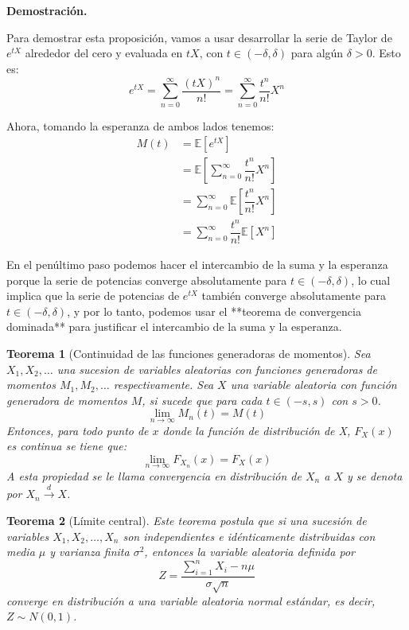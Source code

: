 \documentclass[
 12pt,
 letterpaper,
]{article}
\theoremstyle{teoremaBreak}
\newtheorem{teorema}{Teorema}[section]
\theoremstyle{plain}
\theoremstyle{definition}
\begin{document}
\textbf{Demostración.}

Para demostrar esta proposición, vamos a usar desarrollar la serie de Taylor de $e^{tX}$ alrededor 
del cero y evaluada en $tX$, con $t \in (-\delta, \delta)$ para algún $\delta > 0$. Esto es:
$$e^{tX} = \sum_{n=0}^{\infty} \dfrac{(tX)^n}{n!} = \sum_{n=0}^{\infty} \dfrac{t^n}{n!} X^n$$

Ahora, tomando la esperanza de ambos lados tenemos:
\begin{align*}
M(t) &= \mathbb{E}[e^{tX}] \\
&= \mathbb{E}\left[\sum_{n=0}^{\infty} \dfrac{t^n}{n!} X^n\right] \\
&= \sum_{n=0}^{\infty} \mathbb{E}\left[ \dfrac{t^n}{n!} X^n\right] \\
&= \sum_{n=0}^{\infty} \dfrac{t^n}{n!} \mathbb{E}[X^n]
\end{align*}

En el penúltimo paso podemos hacer el intercambio de la suma y la esperanza porque 
la serie de potencias converge absolutamente para $t \in (-\delta, \delta)$, 
lo cual implica que la serie de potencias de $e^{tX}$ también converge absolutamente para 
$t \in (-\delta, \delta)$, y por lo tanto, podemos usar el **teorema de convergencia dominada** para 
justificar el intercambio de la suma y la esperanza.

\begin{teorema}[Continuidad de las funciones generadoras de momentos]
Sea $X_1, X_2, \ldots$ una sucesion de variables aleatorias con funciones generadoras de momentos
 $M_1, M_2, \ldots$ respectivamente. Sea $X$ una variable aleatoria con función generadora de momentos 
 $M$, si sucede que para cada $t \in (-s, s)$ con $s > 0$. 
$$\lim_{n \to \infty} M_n(t) = M(t)$$
Entonces, para todo punto de $x$ donde la función de distribución de X, $F_X(x)$ es continua se tiene que:
$$\lim_{n \to \infty} F_{X_n}(x) = F_X(x)$$
A esta propiedad se le llama convergencia en distribución de $X_n$ a $X$ y se denota 
por $X_n \xrightarrow{d} X$.
\end{teorema}




\begin{teorema}[Límite central]
Este teorema postula que si una sucesión de variables $X_1, X_2, \ldots , X_n$ son independientes 
e idénticamente distribuidas con media $\mu$ y varianza finita $\sigma^2$, entonces la variable aleatoria 
definida por $$Z = \dfrac{\sum_{i=1}^n X_i - n\mu}{\sigma \sqrt{n}}$$ converge en distribución a una 
variable aleatoria normal estándar, es decir, $Z \sim N(0,1)$.
\end{teorema}
\end{document}
